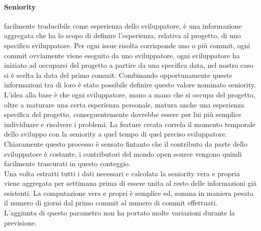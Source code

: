 \documentclass[%
    corpo=12pt,
    twoside,
    oldstyle,
    autoretitolo,
    greek,
    evenboxes,
]{toptesi}
\begin{document}
\paragraph{Seniority} facilmente traducibile come esperienza dello sviluppatore, è una informazione aggregata che ha lo scopo di definire l'esperienza, relativa al progetto, di uno specifico sviluppatore. Per ogni issue risolta corrisponde uno o più commit, ogni commit ovviamente viene eseguito da uno sviluppatore, ogni sviluppatore ha iniziato ad occuparsi del progetto a partire da una specifica data, nel nostro caso si è scelta la data del primo commit. Combinando opportunamente queste informazioni tra di loro è stato possibile definire questo valore nominato seniority. L'idea alla base è che ogni sviluppatore, mano a mano che si occupa del progetto, oltre a maturare una certa esperienza personale, matura anche una esperienza specifica del progetto, conseguentemente dovrebbe essere per lui più semplice individuare e risolvere i problemi. La feature creata correla il momento temporale dello sviluppo con la seniority a quel tempo di quel preciso sviluppatore. Chiaramente questo processo è sensato fintanto che il contributo da parte dello sviluppatore è costante, i contributori del mondo open source vengono quindi facilmente trascurati in questo conteggio.\\
Una volta estratti tutti i dati necessari e calcolata la seniority vera e propria viene aggregata per settimana prima di essere unita al resto delle informazioni già esistenti. La computazione vera e propri è semplice ed, somma in maniera pesata il numero di giorni dal primo commit al numero di commit effettuati.\\
L'aggiunta di questo parametro non ha portato molte variazioni durante la previsione.
\end{document}
